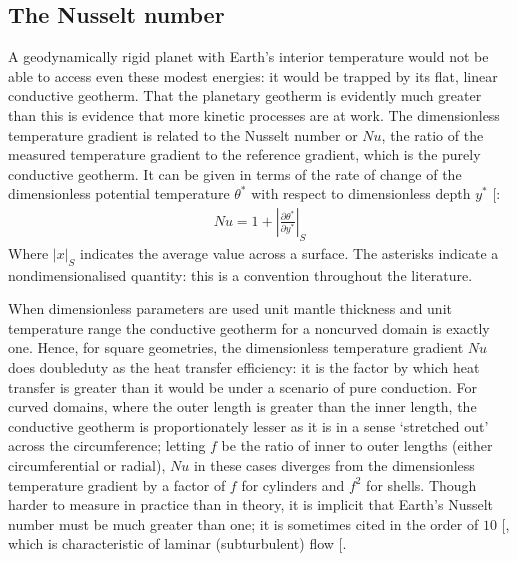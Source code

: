 \documentclass[letterpaper,10pt,english]{jupyterBook}
\begin{document}
\subsection{The Nusselt number}
\label{\detokenize{content/chapter_02_methods/section1:the-nusselt-number}}
\sphinxAtStartPar
A geodynamically rigid planet with Earth’s interior temperature would not be able to access even these modest energies: it would be trapped by its flat, linear conductive geotherm. That the planetary geotherm is evidently much greater than this is evidence that more kinetic processes are at work. The dimensionless temperature gradient is related to the Nusselt number or \(Nu\), the ratio of the measured temperature gradient to the reference gradient, which is the purely conductive geotherm. It can be given in terms of the rate of change of the dimensionless potential temperature \(\theta^*\) with respect to dimensionless depth \(y^*\) {[}\sphinxcite{references:id89}{]}:
\begin{equation*}
\begin{split} Nu = 1 + \left| \frac{\partial \theta^*}{\partial y^*} \right| _S \end{split}
\end{equation*}
\sphinxAtStartPar
Where \(|x|_S\) indicates the average value across a surface. The asterisks indicate a non\sphinxhyphen{}dimensionalised quantity: this is a convention throughout the literature.

\sphinxAtStartPar
When dimensionless parameters are used \sphinxhyphen{} unit mantle thickness and unit temperature range \sphinxhyphen{} the conductive geotherm for a non\sphinxhyphen{}curved domain is exactly one. Hence, for square geometries, the dimensionless temperature gradient \(Nu\) does double\sphinxhyphen{}duty as the heat transfer efficiency: it is the factor by which heat transfer is greater than it would be under a scenario of pure conduction. For curved domains, where the outer length is greater than the inner length, the conductive geotherm is proportionately lesser as it is in a sense ‘stretched out’ across the circumference; letting \(f\) be the ratio of inner to outer lengths (either circumferential or radial), \(Nu\) in these cases diverges from the dimensionless temperature gradient by a factor of \(f\) for cylinders and \(f^2\) for shells. Though harder to measure in practice than in theory, it is implicit that Earth’s Nusselt number must be much greater than one; it is sometimes cited in the order of \(10\) {[}\sphinxcite{references:id84}{]}, which is characteristic of laminar (sub\sphinxhyphen{}turbulent) flow {[}\sphinxcite{references:id83}{]}.
\end{document}
